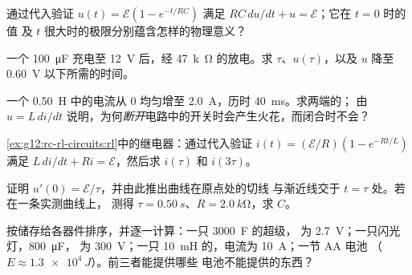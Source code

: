 \begin{exercise}[$\star\star$]\label{exo:g12:rc-rl-circuits:7}
通过代入验证 $u(t) = \mathcal{E}(1 - e^{-t/RC})$
满足 $RC\,du/dt + u = \mathcal{E}$；它在 $t = 0$ 时的值
及 $t$ 很大时的极限分别蕴含怎样的物理意义？
\end{exercise}

\begin{exercise}[$\star\star$]\label{exo:g12:rc-rl-circuits:8}
一个 \qty{100}{\micro F} 充电至 \qty{12}{V} 后，经
\qty{47}{k\ohm} 的放电。求 $\tau$、$u(\tau)$，以及 $u$ 降至
\qty{0.60}{V} 以下所需的时间。
\end{exercise}

\begin{exercise}[$\star\star$]\label{exo:g12:rc-rl-circuits:9}
一个 \qty{0.50}{H} 中的电流从 $0$ 均匀增至
\qty{2.0}{A}，历时 \qty{40}{ms}。求两端的；
由 $u = L\,di/dt$ 说明，为何\emph{断开}电路中的开关时会产生火花，而闭合时不会？
\end{exercise}

\begin{exercise}[$\star\star$]\label{exo:g12:rc-rl-circuits:10}
\cref{ex:g12:rc-rl-circuits:rl}中的继电器：通过代入验证
$i(t) = (\mathcal{E}/R)(1 - e^{-Rt/L})$ 满足
$L\,di/dt + Ri = \mathcal{E}$，然后求 $i(\tau)$ 和 $i(3\tau)$。
\end{exercise}

\begin{exercise}[$\star\star$]\label{exo:g12:rc-rl-circuits:11}
证明 $u'(0) = \mathcal{E}/\tau$，并由此推出曲线在原点处的切线
与渐近线交于 $t = \tau$ 处。若在一条实测曲线上，
测得 $\tau = \qty{0.50}{s}$、$R = \qty{2.0}{k\ohm}$，求 $C$。
\end{exercise}

\begin{exercise}[$\star\star\star$]\label{exo:g12:rc-rl-circuits:12}
按储存给各器件排序，并逐一计算：一只 \qty{3000}{F} 的超级，
为 \qty{2.7}{V}；一只闪光灯，\qty{800}{\micro F}，
为 \qty{300}{V}；一只 \qty{10}{mH} 的，电流为 \qty{10}{A}；一节 AA 电池
（$E \approx \qty{1.3e4}{J}$）。前三者能提供哪些
电池不能提供的东西？
\end{exercise}

